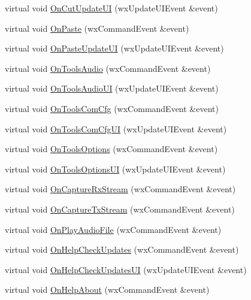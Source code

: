 \begin{DoxyCompactItemize}
\item 
virtual void \hyperlink{class_top_frame_a53e123763a3b9ec0ec5c58017f70b48e}{On\-Cut\-Update\-U\-I} (wx\-Update\-U\-I\-Event \&event)
\item 
virtual void \hyperlink{class_top_frame_ac76966928c8491bb5adbd1acc8678fd5}{On\-Paste} (wx\-Command\-Event \&event)
\item 
virtual void \hyperlink{class_top_frame_a384a65f40c483dcbd2cc1151bd71bfbb}{On\-Paste\-Update\-U\-I} (wx\-Update\-U\-I\-Event \&event)
\item 
virtual void \hyperlink{class_top_frame_aed15be3f44741ca04b3681ec625a326b}{On\-Tools\-Audio} (wx\-Command\-Event \&event)
\item 
virtual void \hyperlink{class_top_frame_ad8454329da0c84b5097524c4b11702ef}{On\-Tools\-Audio\-U\-I} (wx\-Update\-U\-I\-Event \&event)
\item 
virtual void \hyperlink{class_top_frame_a4da08864997b39e455cb27baf149158e}{On\-Tools\-Com\-Cfg} (wx\-Command\-Event \&event)
\item 
virtual void \hyperlink{class_top_frame_ae6a2fcaea9f637a07c268966e3701a7f}{On\-Tools\-Com\-Cfg\-U\-I} (wx\-Update\-U\-I\-Event \&event)
\item 
virtual void \hyperlink{class_top_frame_ad5868b1c2fde8ca783406adc8ef0265e}{On\-Tools\-Options} (wx\-Command\-Event \&event)
\item 
virtual void \hyperlink{class_top_frame_a8e2097cede4251a0af1b514644e2af7d}{On\-Tools\-Options\-U\-I} (wx\-Update\-U\-I\-Event \&event)
\item 
virtual void \hyperlink{class_top_frame_a9df4550ab45099f529c0c590494711f1}{On\-Capture\-Rx\-Stream} (wx\-Command\-Event \&event)
\item 
virtual void \hyperlink{class_top_frame_a62ff15f1e41b0f427dd38eb5141ff28f}{On\-Capture\-Tx\-Stream} (wx\-Command\-Event \&event)
\item 
virtual void \hyperlink{class_top_frame_a6d4b2952ca287bc60f8c4086b0a5e61c}{On\-Play\-Audio\-File} (wx\-Command\-Event \&event)
\item 
virtual void \hyperlink{class_top_frame_a942a998d831614a31f69b9d91aacff33}{On\-Help\-Check\-Updates} (wx\-Command\-Event \&event)
\item 
virtual void \hyperlink{class_top_frame_a9512f3c04c2e9ab2c47f84141547fd1d}{On\-Help\-Check\-Updates\-U\-I} (wx\-Update\-U\-I\-Event \&event)
\item 
virtual void \hyperlink{class_top_frame_ad455667bbd5107f04f82b8ee748d9eb5}{On\-Help\-About} (wx\-Command\-Event \&event)

\end{DoxyCompactItemize}

